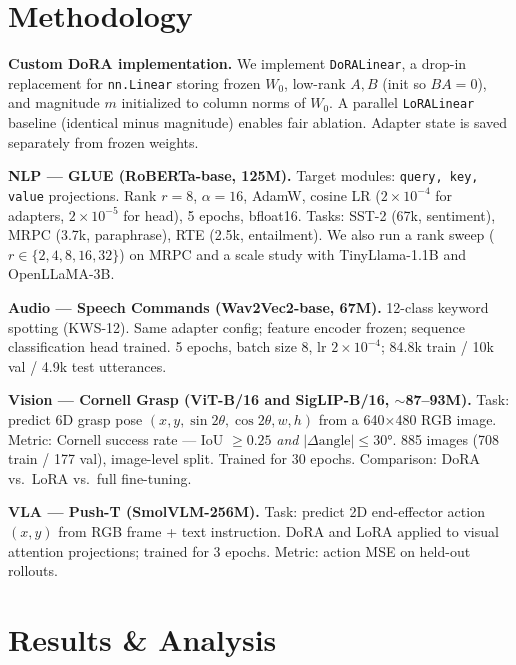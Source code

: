 \documentclass[11pt]{article}
\begin{document}
\section{Methodology}

\textbf{Custom DoRA implementation.}
We implement \texttt{DoRALinear}, a drop-in replacement for \texttt{nn.Linear} storing frozen $W_0$, low-rank $A,B$ (init so $BA{=}0$), and magnitude $m$ initialized to column norms of $W_0$.
A parallel \texttt{LoRALinear} baseline (identical minus magnitude) enables fair ablation. Adapter state is saved separately from frozen weights.

\textbf{NLP — GLUE (RoBERTa-base, 125M).}
Target modules: \texttt{query, key, value} projections.
Rank $r=8$, $\alpha=16$, AdamW, cosine LR ($2\!\times\!10^{-4}$ for adapters, $2\!\times\!10^{-5}$ for head), 5 epochs, bfloat16.
Tasks: SST-2 (67k, sentiment), MRPC (3.7k, paraphrase), RTE (2.5k, entailment).
We also run a rank sweep ($r \in \{2,4,8,16,32\}$) on MRPC and a scale study with TinyLlama-1.1B and OpenLLaMA-3B.

\textbf{Audio — Speech Commands (Wav2Vec2-base, 67M).}
12-class keyword spotting (KWS-12). Same adapter config; feature encoder frozen; sequence classification head trained.
5 epochs, batch size 8, lr $2\!\times\!10^{-4}$; 84.8k train / 10k val / 4.9k test utterances.

\textbf{Vision — Cornell Grasp (ViT-B/16 and SigLIP-B/16, $\sim$87--93M).}
Task: predict 6D grasp pose $(x,y,\sin 2\theta, \cos 2\theta, w, h)$ from a 640$\times$480 RGB image.
Metric: Cornell success rate — IoU $\geq 0.25$ \emph{and} $|\Delta\text{angle}| \leq 30°$.
885 images (708 train / 177 val), image-level split. Trained for 30 epochs.
Comparison: DoRA vs.\ LoRA vs.\ full fine-tuning.

\textbf{VLA — Push-T (SmolVLM-256M).}
Task: predict 2D end-effector action $(x,y)$ from RGB frame + text instruction.
DoRA and LoRA applied to visual attention projections; trained for 3 epochs.
Metric: action MSE on held-out rollouts.

\section{Results \& Analysis}
\end{document}
